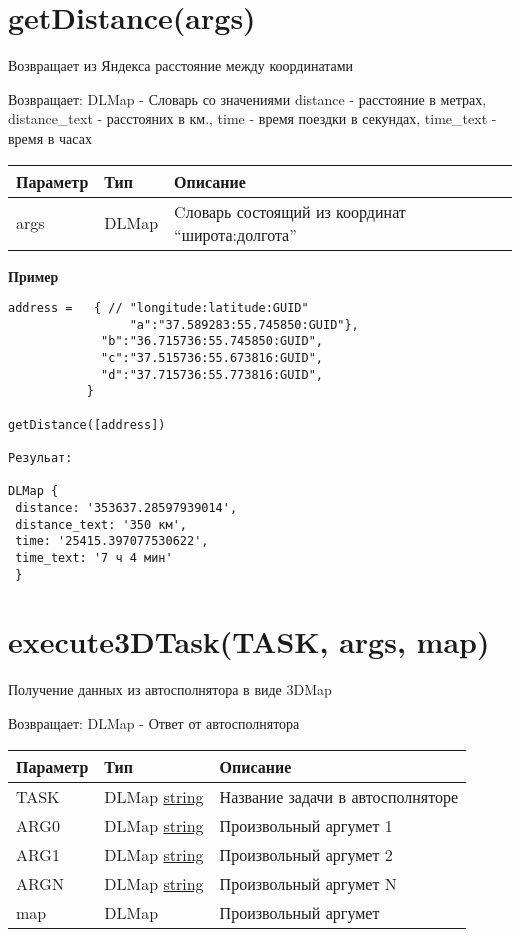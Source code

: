 \hypertarget{getdistanceargs-dlmap}{%
\section{getDistance(args)}\label{getdistanceargs-dlmap}}

Возвращает из Яндекса расстояние между координатами

Возвращает: DLMap - Словарь со значениями distance - расстояние в
метрах, distance\_text - расстояних в км., time - время поездки в
секундах, time\_text - время в часах

\begin{longtable}[]{@{}lll@{}}
\toprule
Параметр & Тип & Описание\tabularnewline
\midrule
\endhead
args & DLMap & Cловарь состоящий из координат
``широта:долгота''\tabularnewline
\bottomrule
\end{longtable}

\textbf{Пример}

\begin{verbatim}
address =   { // "longitude:latitude:GUID"
                 "a":"37.589283:55.745850:GUID"},
             "b":"36.715736:55.745850:GUID",
             "c":"37.515736:55.673816:GUID",
             "d":"37.715736:55.773816:GUID",
           }

getDistance([address])

Резульат:

DLMap {
 distance: '353637.28597939014',
 distance_text: '350 км',
 time: '25415.397077530622',
 time_text: '7 ч 4 мин'
 }
\end{verbatim}

\hypertarget{execute3dtasktask-arg0-arg1-argn-map-dlmap}{%
\section{execute3DTask(TASK, args, map)}\label{execute3dtasktask-arg0-arg1-argn-map-dlmap}}

Получение данных из автосполнятора в виде 3DMap

Возвращает: DLMap - Ответ от автосполнятора

\begin{longtable}[]{@{}lll@{}}
\toprule
Параметр & Тип & Описание\tabularnewline
\midrule
\endhead
TASK & DLMap \textbar{} \protect\hyperlink{string}{string} & Название
задачи в автосполняторе\tabularnewline
ARG0 & DLMap \textbar{} \protect\hyperlink{string}{string} &
Произвольный аргумет 1\tabularnewline
ARG1 & DLMap \textbar{} \protect\hyperlink{string}{string} &
Произвольный аргумет 2\tabularnewline
ARGN & DLMap \textbar{} \protect\hyperlink{string}{string} &
Произвольный аргумет N\tabularnewline
map & DLMap & Произвольный аргумет\tabularnewline
\bottomrule
\end{longtable}

